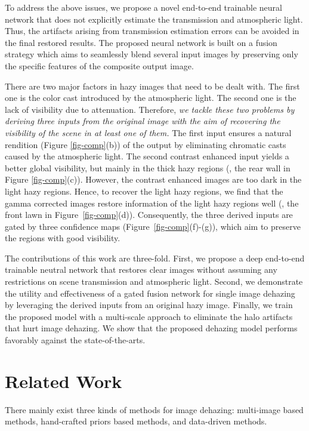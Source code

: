 \documentclass[10pt,twocolumn,letterpaper]{article}
\begin{document}
To address the above issues, we propose a novel end-to-end trainable neural network that does not explicitly estimate the transmission and atmospheric light. Thus, the artifacts arising from transmission estimation errors can be avoided in the final restored results.
The proposed neural network is built on a fusion strategy which aims to seamlessly blend several input images by preserving only the specific features of the composite output image.


There are two major factors in hazy images that need to be dealt with. The first one is the color cast introduced by the atmospheric light. The second one is the lack of visibility due to attenuation.
Therefore, \textit{we tackle these two problems by deriving three inputs from the original image with the aim of recovering the visibility of the scene in at least one of them.}
The first input ensures a natural rendition (Figure \ref{fig-comp}(b)) of the output by eliminating chromatic casts caused by the atmospheric light.
The second contrast enhanced input yields a better global visibility, but mainly in the thick hazy regions (\eg, the rear wall in Figure \ref{fig-comp}(c)). However, the contrast enhanced images are too dark in the light hazy regions. Hence, to recover the light hazy regions, we find that the gamma corrected images restore information of the light hazy regions well (\eg, the front lawn in Figure~\ref{fig-comp}(d)).
Consequently, the three derived inputs are gated by three confidence maps (Figure~\ref{fig-comp}(f)-(g)), which aim to preserve the regions with good visibility.




The contributions of this work are three-fold.
First, we propose a deep end-to-end trainable neutral network that restores clear images without assuming any restrictions on scene transmission and atmospheric light.
Second, we demonstrate the utility and effectiveness of a gated fusion network for single image dehazing by leveraging the derived inputs from an original hazy image.
Finally, we train the proposed model with a multi-scale approach to eliminate the halo artifacts that hurt image dehazing.
We show that the proposed dehazing model performs favorably against the state-of-the-arts.


\vspace{-0.2cm}
\section{Related Work}
\vspace{-0.1cm}
There mainly exist three kinds of methods for image dehazing: multi-image based methods, hand-crafted priors based methods,
and data-driven methods.
\end{document}
